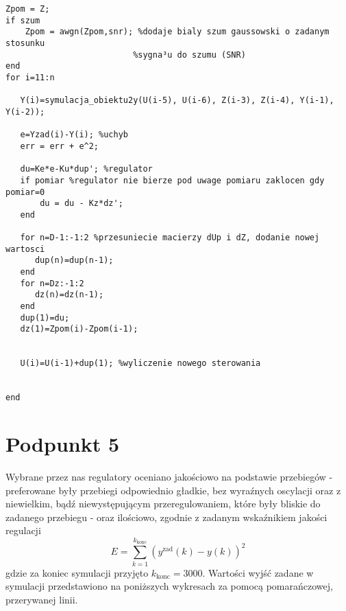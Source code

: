 \begin{lstlisting}[style=Matlab-editor]
%glowna petla
Zpom = Z;
if szum
    Zpom = awgn(Zpom,snr); %dodaje bialy szum gaussowski o zadanym stosunku
                          %sygna³u do szumu (SNR)
end
for i=11:n

   Y(i)=symulacja_obiektu2y(U(i-5), U(i-6), Z(i-3), Z(i-4), Y(i-1), Y(i-2));

   e=Yzad(i)-Y(i); %uchyb
   err = err + e^2;

   du=Ke*e-Ku*dup'; %regulator
   if pomiar %regulator nie bierze pod uwage pomiaru zaklocen gdy pomiar=0
       du = du - Kz*dz';
   end

   for n=D-1:-1:2 %przesuniecie macierzy dUp i dZ, dodanie nowej wartosci
      dup(n)=dup(n-1);
   end
   for n=Dz:-1:2
      dz(n)=dz(n-1);
   end
   dup(1)=du;
   dz(1)=Zpom(i)-Zpom(i-1);


   U(i)=U(i-1)+dup(1); %wyliczenie nowego sterowania


end
\end{lstlisting}


\begin{figure}[ht]
\centering

\caption{}
\label{Z4a}
\end{figure}
\begin{figure}[ht]
\centering

\caption{}
\label{Z4b}
\end{figure}
\begin{figure}[ht]
\centering

\caption{}
\label{Z4c}
\end{figure}
\begin{figure}[ht]
\centering

\caption{}
\label{Z4d}
\end{figure}


\chapter{Podpunkt 5}
Wybrane przez nas regulatory oceniano jakościowo na podstawie przebiegów - preferowane były przebiegi odpowiednio gładkie, bez wyraźnych oscylacji oraz z niewielkim, bądź niewystępującym przeregulowaniem, które były bliskie do zadanego przebiegu - oraz ilościowo, zgodnie z zadanym wskaźnikiem jakości regulacji
\begin{equation}
E = \sum_{k=1}^{k_{\mathrm{konc}}}(y^{\mathrm{zad}}(k) - y(k))^2
\label{E}
\end{equation}
gdzie za koniec symulacji przyjęto $k_{\mathrm{konc}}=3000$. Wartości wyjść zadane w symulacji przedstawiono na poniższych wykresach za pomocą pomarańczowej, przerywanej linii.

